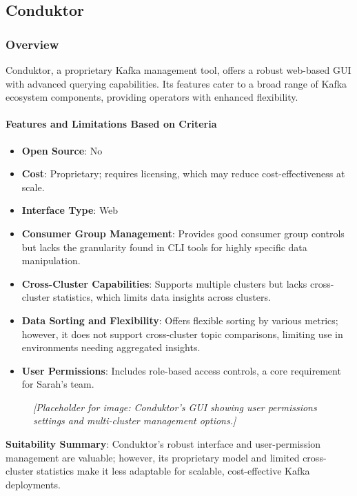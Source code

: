 \documentclass[10pt , a4paper]{report}
\begin{document}
\subsection{Conduktor} 
\subsubsection*{Overview} 
Conduktor, a proprietary Kafka management tool, offers a robust web-based GUI with advanced querying capabilities. Its features cater to a broad range of Kafka ecosystem components, providing operators with enhanced flexibility.

\paragraph{Features and Limitations Based on Criteria}
\begin{itemize} 
    \item \small \textbf{Open Source}: No
    \item \small \textbf{Cost}: Proprietary; requires licensing, which may reduce cost-effectiveness at scale.
    \item \small \textbf{Interface Type}: Web
    \item \small \textbf{Consumer Group Management}: Provides good consumer group controls but lacks the granularity found in CLI tools for highly specific data manipulation.
    \item \small \textbf{Cross-Cluster Capabilities}: Supports multiple clusters but lacks cross-cluster statistics, which limits data insights across clusters.
    \item \small \textbf{Data Sorting and Flexibility}: Offers flexible sorting by various metrics; however, it does not support cross-cluster topic comparisons, limiting use in environments needing aggregated insights.
    \item \small \textbf{User Permissions}: Includes role-based access controls, a core requirement for Sarah’s team.
\end{itemize}

\begin{figure}[h] 
\centering 
\textit{[Placeholder for image: Conduktor’s GUI showing user permissions settings and multi-cluster management options.]} 
\end{figure}

\textbf{Suitability Summary}: Conduktor’s robust interface and user-permission management are valuable; however, its proprietary model and limited cross-cluster statistics make it less adaptable for scalable, cost-effective Kafka deployments.
\end{document}
